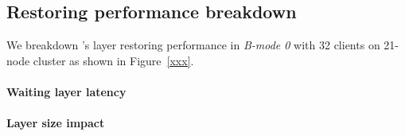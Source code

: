 \subsection{Restoring performance breakdown}

We breakdown \sysname's layer restoring performance in \emph{B-mode 0}
with 32 clients on 21-node cluster as shown in Figure~\ref{xxx}.%








\paragraph{Waiting layer latency}

\paragraph{Layer size impact}

